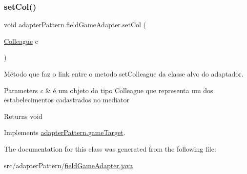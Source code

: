 \subsubsection{\texorpdfstring{setCol()}{setCol()}}
{\footnotesize\ttfamily void adapter\+Pattern.\+field\+Game\+Adapter.\+set\+Col (\begin{DoxyParamCaption}\item[{\mbox{\hyperlink{classmediator_pattern_1_1_colleague}{Colleague}}}]{c }\end{DoxyParamCaption})}



Método que faz o link entre o metodo set\+Colleague da classe alvo do adaptador. 


\begin{DoxyParams}{Parameters}
{\em c} & é um objeto do tipo Colleague que representa um dos estabelecimentos cadastrados no mediator \\
\hline
\end{DoxyParams}
\begin{DoxyReturn}{Returns}
void 
\end{DoxyReturn}


Implements \mbox{\hyperlink{interfaceadapter_pattern_1_1game_target_ae4493af8f85c0459e4e628ffff3fe3b9}{adapter\+Pattern.\+game\+Target}}.



The documentation for this class was generated from the following file\+:\begin{DoxyCompactItemize}
\item 
src/adapter\+Pattern/\mbox{\hyperlink{field_game_adapter_8java}{field\+Game\+Adapter.\+java}}\end{DoxyCompactItemize}
